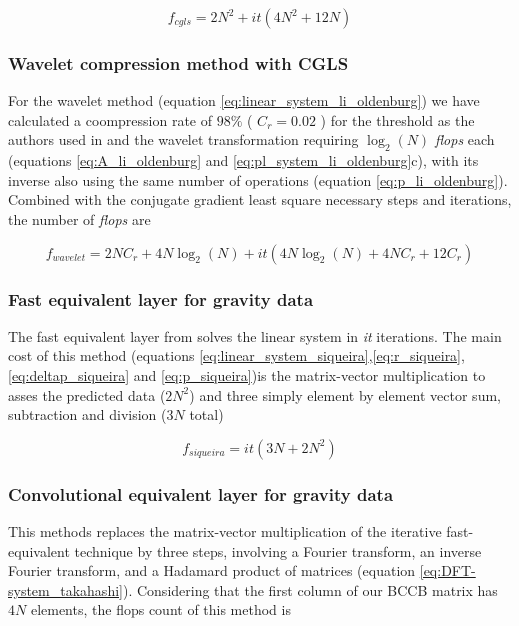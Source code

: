 \begin{equation}
	f_{cgls} = 2N^2 + it(4N^2 + 12N)
\label{cgls}
\end{equation}

\subsubsection{Wavelet compression method with CGLS \citep{li-oldenburg2010}}

For the wavelet method (equation \ref{eq:linear_system_li_oldenburg}) we have calculated a coompression rate of $98\%$ ( $C_r = 0.02$ ) for the threshold as the authors used in \cite{li-oldenburg2010} and the wavelet transformation requiring $\log_2(N)$ \textit{flops} each (equations \ref{eq:A_li_oldenburg} and \ref{eq:pl_system_li_oldenburg}c), with its inverse also using the same number of operations (equation \ref{eq:p_li_oldenburg}). Combined with the conjugate gradient least square necessary steps and iterations, the number of \textit{flops} are

\begin{equation}
	f_{wavelet} = 2NC_r + 4N\log_2(N) + it(4N\log_2(N) + 4NC_r + 12C_r)
\label{wavelet}
\end{equation}

\subsubsection{Fast equivalent layer for gravity data \citep{siqueira-etal2017}}

The fast equivalent layer from \cite{siqueira-etal2017} solves the linear system in \textit{it} iterations. The main cost of this method (equations \ref{eq:linear_system_siqueira},\ref{eq:r_siqueira}, \ref{eq:deltap_siqueira} and \ref{eq:p_siqueira})is the matrix-vector multiplication to asses the predicted data ($2N^2$) and three simply element by element vector sum, subtraction and division ($3N$ total)

\begin{equation}
	f_{siqueira} = it(3N +2N^2)
	\label{siqueira}
\end{equation}

\subsubsection{Convolutional equivalent layer for gravity data \citep{takahashi2020}}

This methods replaces the matrix-vector multiplication of the iterative fast-equivalent technique \citep{siqueira-etal2017} by three steps, involving a Fourier transform, an inverse Fourier transform, and a Hadamard product of matrices (equation \ref{eq:DFT-system_takahashi}). Considering that the first column of our BCCB matrix has $4N$ elements, the flops count of this method is

